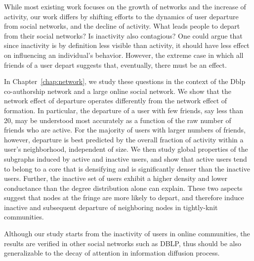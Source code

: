 \documentclass[phd,tocprelim]{cornell}
\begin{document}

While most existing work focuses on the growth of networks and the increase of activity, our work differs by shifting efforts to the dynamics of user departure from social networks, and the decline of activity. What leads people to depart from their social networks? Is inactivity also contagious? One could argue that since inactivity is by definition less visible than activity, it should have less effect on influencing an individual's behavior. However, the extreme case in which all friends of a user depart suggests that, eventually, there must be an effect. 

In Chapter~\ref{chap:network}, we study these questions in the context of the Dblp co-authorship network and a large online social network. We show that the network effect of departure operates differently from the network effect of formation.  In particular, the departure of a user with few friends, say less than 20, may be understood most accurately as a function of the raw number of friends who are active.  For the majority of users with larger numbers of friends, however, departure is best predicted by the overall fraction of activity within a user's neighborhood, independent of size.  We then study global properties of the subgraphs induced by active and inactive users, and show that active users tend to belong to a core that is densifying and is significantly denser than
the inactive users. Further, the inactive set of users exhibit a higher density and lower conductance than the degree distribution alone can explain. These two aspects suggest that nodes at the fringe are more likely to depart, and therefore induce inactive and subsequent departure of neighboring nodes in tightly-knit communities. 

Although our study starts from the inactivity of users in online communities, the results are verified in other social networks such as DBLP, thus should be also generalizable to the decay of attention in information diffusion process.



\end{document}
